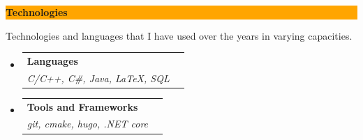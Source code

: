 \documentclass[letterpaper,11pt]{article}
\makeatletter
\newcommand{\resitem}[1]{\item #1 \vspace{-2pt}}
\newcommand{\resheading}[1]{{\large
    \colorbox{Orange}{\begin{minipage}{\textwidth}{\textbf{#1
            \vphantom{p\^{E}}}}\end{minipage}}}}
\newcommand{\ressubheading}[4]{
  \begin{tabular*}{6.5in}{l@{\extracolsep{\fill}}r}
    \textbf{#1} & #2 \\
    \textit{#3} & \textit{#4} \\
  \end{tabular*}\vspace{-6pt}}
\makeatother
\begin{document}
\begin{itemize}
%
\end{itemize} %



\resheading{Technologies}
Technologies and languages that I have used over the years in varying capacities.
\begin{itemize}
	\item \ressubheading{Languages}
		{}
		{C/C++, C\#, Java, {\LaTeX}, SQL}
		{}
	\item \ressubheading{Tools and Frameworks}
		{}
		{git, cmake, hugo, .NET core}
		{}
\end{itemize} %
\end{document}
